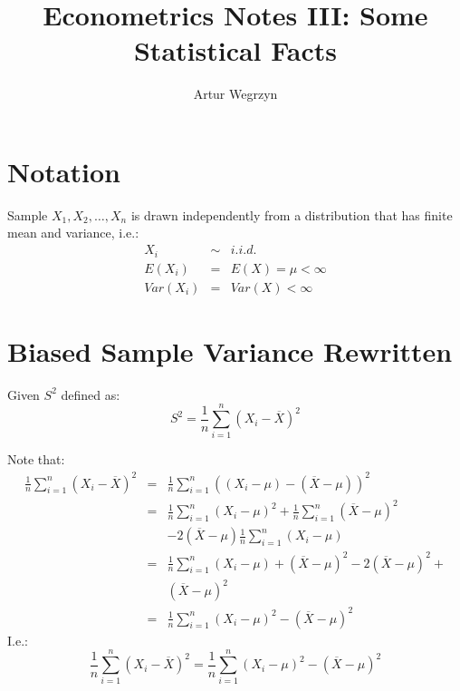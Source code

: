 \documentclass[12pt]{article}
\begin{document}
\title{Econometrics Notes III: Some Statistical Facts}
\author{Artur Wegrzyn}
\maketitle


\tableofcontents

\section{Notation}
Sample $X_1, X_2, \dots, X_n$ is drawn independently from a distribution that
has finite mean and variance, i.e.:
\begin{eqnarray*}
X_i &\sim & i.i.d. \\
E(X_i) &=& E(X) = \mu < \infty \\
Var(X_i) &=& Var(X) < \infty
\end{eqnarray*}


\section{Biased Sample Variance Rewritten}
Given $S^2$ defined as:
\begin{equation}
\label{biased_variance_estimator}
S^2 = \frac{1}{n}\sum_{i=1}^{n} (X_i - \overline{X})^2
\end{equation}

Note that:
\begin{eqnarray*}
\frac{1}{n}\sum_{i=1}^{n} (X_i - \overline{X})^2 &=& 
\frac{1}{n}\sum_{i=1}^{n}\left( 
(X_i - \mu) - (\overline{X} - \mu)
\right)^2 \\
&=& \frac{1}{n} \sum_{i=1}^{n}(X_i - \mu)^2 + 
\frac{1}{n} \sum_{i=1}^{n}(\overline{X} - \mu)^2 \\
&& - 2 (\overline{X} - \mu) \frac{1}{n} \sum_{i=1}^{n} (X_i - \mu) \\
&=& \frac{1}{n} \sum_{i=1}^{n}(X_i - \mu) + (\overline{X} - \mu)^2 
- 2 (\overline{X} - \mu)^2 + \\ && (\overline{X} - \mu)^2 \\
&=& \frac{1}{n} \sum_{i=1}^{n} (X_i - \mu)^2 - (\overline{X} - \mu)^2
\end{eqnarray*}
I.e.:
\begin{equation}
\label{biased_variance_estimator_decomposition}
\frac{1}{n} \sum_{i=1}^{n} (X_i - \overline{X})^2 = 
\frac{1}{n} \sum_{i=1}^{n} (X_i - \mu)^2 - (\overline{X} - \mu)^2
\end{equation}
\end{document}
